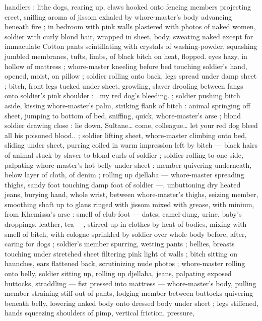 {handlers : lithe dogs, rearing up, claws hooked onto fencing 
members projecting erect, sniffing aroma of jissom exhaled by 
whore-master's body advancing beneath fire ; in bedroom with pink 
walls plastered with photos of naked women, soldier with curly blond 
hair, wrapped in sheet, body, sweating naked except for immaculate 
Cotton pants scintillating with crystals of washing-powder, squashing 
jumbled membranes, tufts, limbs, of black bitch on heat, flopped. 
eyes hazy, in hollow of mattress ; whore-master kneeling before bed 
touching soldier's hand, opened, moist, on pillow ; soldier rolling 
onto back, legs spread under damp sheet ; bitch, front legs tucked 
under sheet, growling, slaver drooling between fangs onto soldier's 
pink shoulder : {\td} {\gl}..my red dog's bleeding.{\gr} ; soldier pushing bitch 
aside, kissing whore-master's palm, striking flank of bitch : animal 
springing off sheet, jumping to bottom of bed, sniffing, quick, 
whore-master's arse ; blond soldier drawing close : {\td} {\gl} {\td} lie down, 
Sultane{\ldots} come, colleague{\ldots} let your red dog bleed all his poisoned 
blood..{\gr} ; soldier lifting sheet, whore-master climbing onto bed, 
sliding under sheet, purring coiled in warm impression left by bitch 
--- black hairs of animal stuck by slaver to blond curls of soldier ; 
soldier rolling to one side, palpating whore-master's hot belly under 
sheet : member quivering underneath, below layer of cloth, of denim 
; rolling up djellaba --- whore-master spreading thighs, sandy foot 
touching damp foot of soldier ---, unbuttoning dry heated jeans, 
burying hand, whole wrist, between whore-master's thighs, seizing 
member, smoothing shaft up to glans ringed with jissom mixed with 
grease, with minium, from Khemissa's arse : smell of club-foot --- 
dates, camel-dung, urine, baby's droppings, leather, tea ---, stirred 
up in clothes by heat of bodies, mixing with smell of bitch, with 
cologne sprinkled by soldier over whole body before, after, caring for 
dogs ; soldier's member spurring, wetting pants ; bellies, breasts 
touching under stretched sheet filtering pink light of walls ; bitch 
sitting on haunches, ears flattened back, scrutinizing nude photos ; 
whore-master rolling onto belly, soldier sitting up, rolling up djellaba, 
jeans, palpating exposed buttocks, straddling --- fist pressed into 
mattress --- whore-master's body, pulling member straining stiff out 
of pants, lodging member between buttocks quivering beneath belly, 
lowering naked body onto dressed body under sheet ; legs stiffened, 
hands squeezing shoulders of pimp, vertical friction, pressure, 
}
